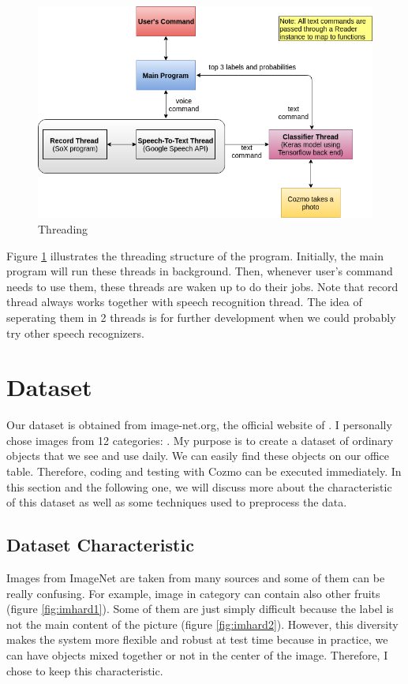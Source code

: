 \begin{figure}[!htb]
	\centering
	\includegraphics[width=0.9\hsize]{./figures/threads}
	\caption{Threading}
	\label{fig:threads}
\end{figure}

Figure \ref{fig:threads} illustrates the threading structure of the program. Initially, the main program will run these threads in background. Then, whenever user's command needs to use them, these threads are waken up to do their jobs. Note that record thread always works together with speech recognition thread. The idea of seperating them in 2 threads is for further development when we could probably try other speech recognizers.

\section{Dataset}
\label{sec:dataset}
Our dataset is obtained from image-net.org, the official website of \cite{ILSVRC15}. I personally chose images from 12 categories: . My purpose is to create a dataset of ordinary objects that we see and use daily. We can easily find these objects on our office table. Therefore, coding and testing with Cozmo can be executed immediately. In this section and the following one, we will discuss more about the characteristic of this dataset as well as some techniques used to preprocess the data.

\subsection{Dataset Characteristic}
Images from ImageNet are taken from many sources and some of them can be really confusing. For example, image in category  can contain also other fruits (figure \ref{fig:imhard1}). Some of them are just simply difficult because the label is not the main content of the picture (figure \ref{fig:imhard2}). However, this diversity makes the system more flexible and robust at test time because in practice, we can have objects mixed together or not in the center of the image. Therefore, I chose to keep this characteristic.

